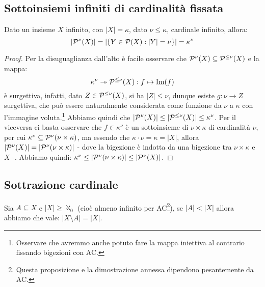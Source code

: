 \pagebreak
\subsection{Sottoinsiemi infiniti di cardinalità fissata}
\begin{proposition}
	Dato un insieme $X$ infinito, con $|X| = \kappa$, dato $\nu \leq \kappa$, cardinale infinito, allora:
	\[ |\mathcal{P}^\nu(X)| = |\{Y \in \mathcal{P}(X) : |Y| = \nu\}| = \kappa^\nu
		\]
\end{proposition}

\begin{proof}
	Per la disuguaglianza dall'alto è facile osservare che $\mathcal{P}^{\nu}(X) \subseteq \mathcal{P}^{\leq \nu}(X)$ e la mappa:
	\[ \kappa^\nu \twoheadrightarrow \mathcal{P}^{\leq \nu}(X) : f \mapsto \operatorname{Im}(f)
		\]
	è surgettiva, infatti, dato $Z \in \mathcal{P}^{\leq \nu}(X)$, si ha $|Z| \leq \nu$, dunque esiste $g : \nu \to Z$ surgettiva, che può essere naturalmente considerata come funzione da $\nu$ a $\kappa$ con l'immagine voluta.\footnote{Osservare che avremmo anche potuto fare la mappa iniettiva al contrario fissando bigezioni con AC.}
	Abbiamo quindi che $|\mathcal{P}^\nu(X)| \leq |\mathcal{P}^{\leq \nu}(X)| \leq \kappa^\nu$. Per il viceversa ci basta osservare che $f\in \kappa^\nu$ è un sottoinsieme di $\nu \times \kappa$ di cardinalità $\nu$, per cui $\kappa^\nu \subseteq \mathcal{P}^{\nu}(\nu \times \kappa)$,
	ma essendo che $\kappa \cdot \nu = \kappa  = |X|$, allora $|\mathcal{P}^{\nu}(X)| = |\mathcal{P}^{\nu}(\nu \times \kappa)|$ - dove la bigezione è indotta da una bigezione tra $\nu \times \kappa$ e $X$ -. Abbiamo quindi: $\kappa^\nu \leq |\mathcal{P}^\nu(\nu \times \kappa)| \leq |\mathcal{P}^\nu(X)|$.
\end{proof}

\subsection{Sottrazione cardinale}
\begin{proposition}
	Sia $A \subseteq X$ e $|X| \geq \aleph_0$ (cioè almeno infinito per AC\footnote{Questa proposizione e la dimostrazione annessa dipendono pesantemente da AC.}), se $|A| < |X|$ allora abbiamo che vale: $|X \setminus A| = |X|$.
\end{proposition}


